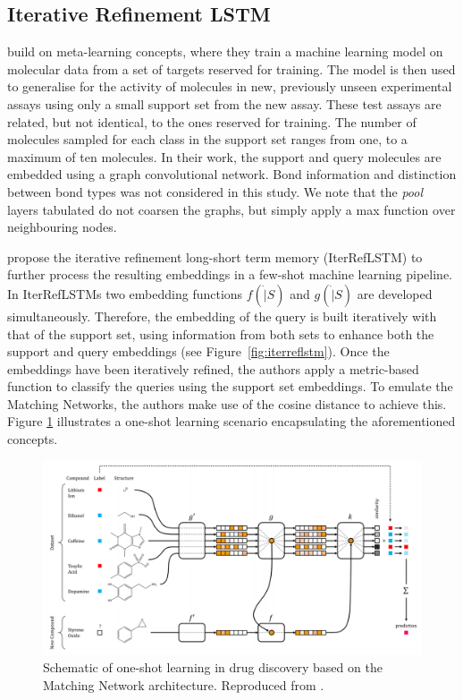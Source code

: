 \subsection{Iterative Refinement LSTM}

\citet{altae2017low} build on meta-learning concepts, where they train a machine learning model on molecular data from a set of targets reserved for training. The model is then used to generalise for the activity of molecules in new, previously unseen experimental assays using only a small support set from the new assay. These test assays are related, but not identical, to the ones reserved for training. The number of molecules sampled for each class in the support set ranges from one, to a maximum of ten molecules. In their work, the support and query molecules are embedded using a graph convolutional network.  Bond information and distinction between bond types was not considered in this study. We note that the \textit{pool} layers tabulated do not coarsen the graphs, but simply apply a max function over neighbouring nodes.

\citet{altae2017low} propose the iterative refinement long-short term memory (IterRefLSTM) to further process the resulting embeddings in a few-shot machine learning pipeline. In IterRefLSTMs two embedding functions $f(\dot|S)$ and $g(\dot|S)$ are developed simultaneously. Therefore, the embedding of the query is built iteratively with that of the support set, using information from both sets to enhance both the support and query embeddings (see Figure~\ref{fig:iterreflstm}). Once the embeddings have been iteratively refined, the authors apply a metric-based function to classify the queries using the support set embeddings. To emulate the Matching Networks, the authors make use of the cosine distance to achieve this. Figure \ref{fig:schematiconeshotdrug} illustrates a one-shot learning scenario encapsulating the aforementioned concepts.

\begin{figure}[h]
	\centering
	\includegraphics[width=0.9\linewidth]{img/pandeschematic.png}
	\caption[Schematic of one-shot learning in drug discovery]{Schematic of one-shot learning in drug discovery based on the Matching Network \citep{vinyals2016matching} architecture. Reproduced from \citet{altae2017low}.}
	\label{fig:schematiconeshotdrug}
\end{figure}
